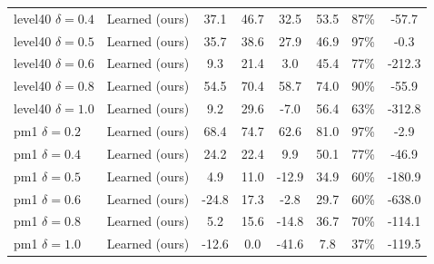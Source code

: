 \begin{tabular}{llcccccc}
level40 $\delta=0.4$ & Learned (ours) & 37.1 & 46.7 & 32.5 & 53.5 & 87\% & -57.7 \\
level40 $\delta=0.5$ & Learned (ours) & 35.7 & 38.6 & 27.9 & 46.9 & 97\% & -0.3 \\
level40 $\delta=0.6$ & Learned (ours) & 9.3 & 21.4 & 3.0 & 45.4 & 77\% & -212.3 \\
level40 $\delta=0.8$ & Learned (ours) & 54.5 & 70.4 & 58.7 & 74.0 & 90\% & -55.9 \\
level40 $\delta=1.0$ & Learned (ours) & 9.2 & 29.6 & -7.0 & 56.4 & 63\% & -312.8 \\
pm1 $\delta=0.2$ & Learned (ours) & 68.4 & 74.7 & 62.6 & 81.0 & 97\% & -2.9 \\
pm1 $\delta=0.4$ & Learned (ours) & 24.2 & 22.4 & 9.9 & 50.1 & 77\% & -46.9 \\
pm1 $\delta=0.5$ & Learned (ours) & 4.9 & 11.0 & -12.9 & 34.9 & 60\% & -180.9 \\
pm1 $\delta=0.6$ & Learned (ours) & -24.8 & 17.3 & -2.8 & 29.7 & 60\% & -638.0 \\
pm1 $\delta=0.8$ & Learned (ours) & 5.2 & 15.6 & -14.8 & 36.7 & 70\% & -114.1 \\
pm1 $\delta=1.0$ & Learned (ours) & -12.6 & 0.0 & -41.6 & 7.8 & 37\% & -119.5 \\
\bottomrule
\end{tabular}
